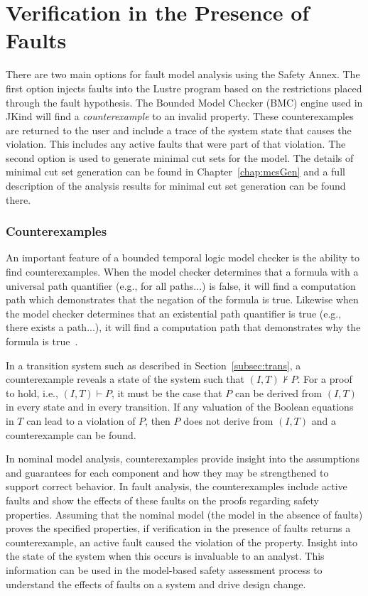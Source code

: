 \section{Verification in the Presence of Faults}
\label{sec:analysisResults}
There are two main options for fault model analysis using the Safety Annex. The first option injects faults into the Lustre program based on the restrictions placed through the fault hypothesis. The Bounded Model Checker (BMC) engine used in JKind will find a {\em counterexample} to an invalid property. These counterexamples are returned to the user and include a trace of the system state that causes the violation. This includes any active faults that were part of that violation. The second option is used to generate minimal cut sets for the model. The details of minimal cut set generation can be found in Chapter~\ref{chap:mcsGen} and a full description of the analysis results for minimal cut set generation can be found there. 

\subsubsection{Counterexamples}
An important feature of a bounded temporal logic model checker is the ability to find counterexamples. When the model checker determines that a formula with a universal path quantifier (e.g., for all paths...) is false, it will find a computation path which demonstrates that the negation of the formula is true. Likewise when the model checker determines that an existential path quantifier is true (e.g., there exists a path...), it will find a computation path that demonstrates why the formula is true~\cite{clarke2018model}. 

In a transition system such as described in Section~\ref{subsec:trans}, a counterexample reveals a state of the system such that $(I, T) \not \vdash P$. For a proof to hold, i.e., $(I, T) \vdash P$, it must be the case that $P$ can be derived from $(I,T)$ in every state and in every transition. If any valuation of the Boolean equations in $T$ can lead to a violation of $P$, then $P$ does not derive from $(I,T)$ and a counterexample can be found. 

In nominal model analysis, counterexamples provide insight into the assumptions and guarantees for each component and how they may be strengthened to support correct behavior. In fault analysis, the counterexamples include active faults and show the effects of these faults on the proofs regarding safety properties. Assuming that the nominal model (the model in the absence of faults) proves the specified properties, if verification in the presence of faults returns a counterexample, an active fault caused the violation of the property. Insight into the state of the system when this occurs is invaluable to an analyst. This information can be used in the model-based safety assessment process to understand the effects of faults on a system and drive design change. 

